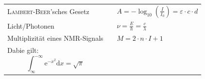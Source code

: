 \documentclass[../main.tex]{subfiles}
\begin{document}
\begin{formulabox}[Spektroskopie]
  \begin{center}
  \renewcommand{\arraystretch}{1.8}
    \begin{tabular}{>{\raggedleft\arraybackslash}p{} p{}p{}}
        \textsc{Lambert}-\textsc{Beer}'sches Gesetz & & $\displaystyle A = -\log_{10}{\left(\frac{I}{I_0}\right)} = \varepsilon \cdot c \cdot d$ \\
        Licht/Photonen & & $\displaystyle \nu = \frac{E}{h} = \frac{c}{\lambda}$ \\
        Multiplizit\"at eines NMR-Signals && $M = 2\cdot n\cdot I +1$\\
        Dabie gilt:
               \[ \int_{\infty}^{-\infty} \mathrm{e}^{-x^{2}}   \mathrm{d}x = \sqrt{\pi} \] 

    \end{tabular}
  \end{center}
\end{formulabox}
\end{document}
